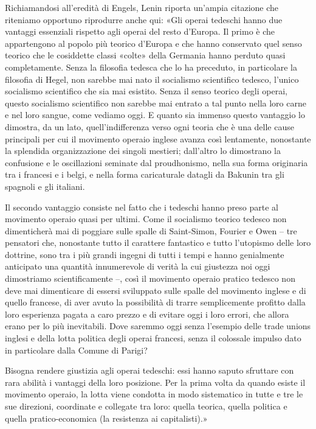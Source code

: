 \documentclass[../main]{subfiles}
\begin{document}
Richiamandosi all'eredità di Engels, Lenin riporta un'ampia citazione che riteniamo opportuno riprodurre anche qui: «Gli operai tedeschi hanno due vantaggi essenziali rispetto agli operai del resto d'Europa. Il primo è che appartengono al popolo più teorico d'Europa e che hanno conservato quel senso teorico che le cosiddette classi «colte» della Germania hanno perduto quasi completamente. Senza la filosofia tedesca che lo ha preceduto, in particolare la filosofia di Hegel, non sarebbe mai nato il socialismo scientifico tedesco, l'unico socialismo scientifico che sia mai esistito. Senza il senso teorico degli operai, questo socialismo scientifico non sarebbe mai entrato a tal punto nella loro carne e nel loro sangue, come vediamo oggi. E quanto sia immenso questo vantaggio lo dimostra, da un lato, quell'indifferenza verso ogni teoria che è una delle cause principali per cui il movimento operaio inglese avanza così lentamente, nonostante la splendida organizzazione dei singoli mestieri; dall'altro lo dimostrano la confusione e le oscillazioni seminate dal proudhonismo, nella sua forma originaria tra i francesi e i belgi, e nella forma caricaturale datagli da Bakunin tra gli spagnoli e gli italiani.

Il secondo vantaggio consiste nel fatto che i tedeschi hanno preso parte al movimento operaio quasi per ultimi. Come il socialismo teorico tedesco non dimenticherà mai di poggiare sulle spalle di Saint-Simon, Fourier e Owen – tre pensatori che, nonostante tutto il carattere fantastico e tutto l'utopismo delle loro dottrine, sono tra i più grandi ingegni di tutti i tempi e hanno genialmente anticipato una quantità innumerevole di verità la cui giustezza noi oggi dimostriamo scientificamente –, così il movimento operaio pratico tedesco non deve mai dimenticare di essersi sviluppato sulle spalle del movimento inglese e di quello francese, di aver avuto la possibilità di trarre semplicemente profitto dalla loro esperienza pagata a caro prezzo e di evitare oggi i loro errori, che allora erano per lo più inevitabili. Dove saremmo oggi senza l'esempio delle trade unions inglesi e della lotta politica degli operai francesi, senza il colossale impulso dato in particolare dalla Comune di Parigi?

Bisogna rendere giustizia agli operai tedeschi: essi hanno saputo sfruttare con rara abilità i vantaggi della loro posizione. Per la prima volta da quando esiste il movimento operaio, la lotta viene condotta in modo sistematico in tutte e tre le sue direzioni, coordinate e collegate tra loro: quella teorica, quella politica e quella pratico-economica (la resistenza ai capitalisti).»
\end{document}
